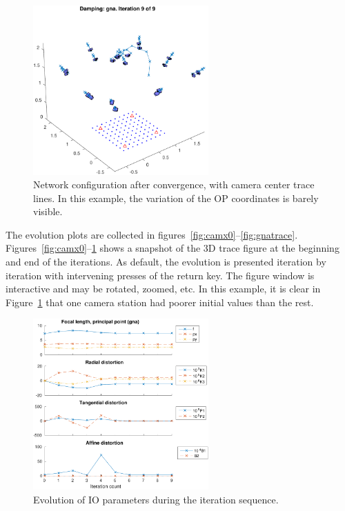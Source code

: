 \documentclass{article}
\begin{document}
\begin{figure}[tbp]
\centering
\includegraphics[width=0.6\textwidth]{./ill/ccamxfinal.pdf}
\caption{\label{fig:camxfinal}
Network configuration after convergence, with camera center trace lines. In this example, the variation of the OP coordinates is barely visible.}
\end{figure}

The evolution plots are collected in
figures~\ref{fig:camx0}--\ref{fig:gnatrace}.
Figures~\ref{fig:camx0}--\ref{fig:camxfinal} shows a snapshot of the 3D trace
figure at the beginning and end of the iterations. As default, the
evolution is presented iteration by iteration with intervening presses
of the return key. The figure window is interactive and may be
rotated, zoomed, etc. In this example, it is clear in
Figure~\ref{fig:camxfinal} that one camera station had poorer initial
values than the rest.

\begin{figure}[tbp]
\centering
\includegraphics[width=0.6\textwidth]{./ill/ccamiotrace.pdf}
\caption{\label{fig:IOtrace}
Evolution of IO parameters during the iteration sequence.}
\end{figure}
\end{document}
